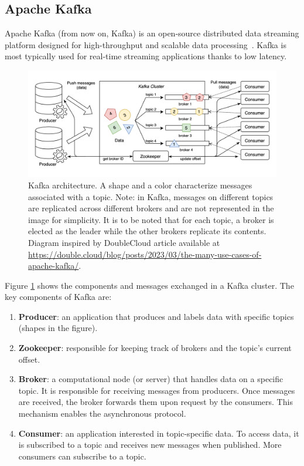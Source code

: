 \subsection{Apache Kafka}

Apache Kafka (from now on, Kafka) is an open-source distributed data streaming platform designed for high-throughput and scalable data processing~\cite{krepsKafkaDistributedMessaging2011}. Kafka is most typically used for real-time streaming applications thanks to low latency. 

\begin{figure}[!ht]
    \begin{center}
      \includegraphics[width=\textwidth]{figures/2-background/kafka.png}
    \end{center}
    \caption[Kafka architecture]{Kafka architecture. A shape and a color characterize messages associated with a topic. Note: in Kafka, messages on different topics are replicated across different brokers and are not represented in the image for simplicity. It is to be noted that for each topic, a broker is elected as the leader while the other brokers replicate its contents. Diagram inspired by DoubleCloud article available at \url{https://double.cloud/blog/posts/2023/03/the-many-use-cases-of-apache-kafka/}.}
    \label{fig:kafka}
\end{figure}

Figure \ref{fig:kafka} shows the components and messages exchanged in a Kafka cluster. The key components of Kafka are:
\begin{enumerate}
    \item \textbf{Producer}: an application that produces and labels data with specific topics (shapes in the figure).
    \item \textbf{Zookeeper}: responsible for keeping track of brokers and the topic's current offset.
    \item \textbf{Broker}: a computational node (or server) that handles data on a specific topic. It is responsible for receiving messages from producers. Once messages are received, the broker forwards them upon request by the consumers. This mechanism enables the asynchronous protocol.
    \item \textbf{Consumer}: an application interested in topic-specific data. To access data, it is subscribed to a topic and receives new messages when published. More consumers can subscribe to a topic.
\end{enumerate}

